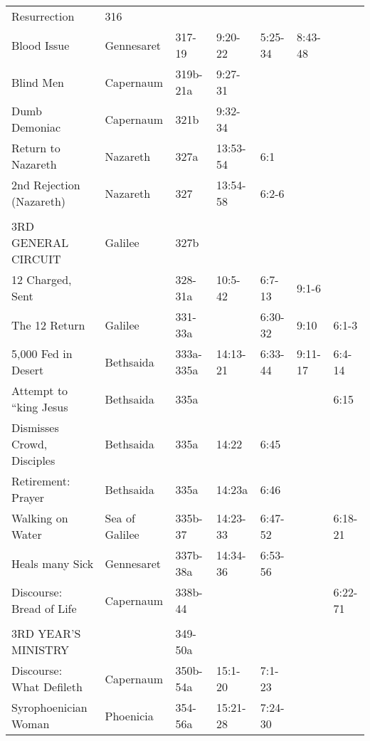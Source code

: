 \begin{longtable}[h]{lllllll}
\qquad Resurrection                & 316                 &            &                 &                 &                      & \\
\quad Blood Issue                  & Gennesaret          & 317-19     & 9:20-22         & 5:25-34         & 8:43-48              & \\
\quad 2 Blind Men                  & Capernaum           & 319b-21a   & 9:27-31         &                 &                      & \\
\quad Dumb Demoniac                & Capernaum           & 321b       & 9:32-34         &                 &                      & \\
Return to Nazareth                 & Nazareth            & 327a       & 13:53-54        & 6:1             &                      & \\
2nd Rejection (Nazareth)           & Nazareth            & 327        & 13:54-58        & 6:2-6           &                      & \\
\\
3RD GENERAL CIRCUIT                & Galilee             & 327b       &                 &                 &                      & \\
12 Charged, Sent                   &                     & 328-31a    & 10:5-42         & 6:7-13          & 9:1-6                & \\
The 12 Return & Galilee & 331-33a &  & 6:30-32 & 9:10 & 6:1-3 \\
5,000 Fed in Desert & Bethsaida & 333a-335a & 14:13-21 & 6:33-44 & 9:11-17 &  6:4-14 \\
\quad Attempt to ``king Jesus & Bethsaida & 335a &  &  &  & 6:15 \\
\quad Dismisses Crowd, Disciples & Bethsaida & 335a & 14:22 & 6:45 & & \\
\quad Retirement: Prayer & Bethsaida & 335a & 14:23a & 6:46 &  &  \\
Walking on Water & Sea of Galilee & 335b-37 & 14:23-33 & 6:47-52 &  & 6:18-21 \\
Heals many Sick & Gennesaret & 337b-38a & 14:34-36 & 6:53-56 &  &  \\
Discourse: Bread of Life & Capernaum & 338b-44 &  &  &  & 6:22-71 \\
\\
3RD YEAR'S MINISTRY &  & 349-50a &  &  &  &  \\
Discourse: What Defileth & Capernaum & 350b-54a & 15:1-20 & 7:1-23 &  &  \\
Syrophoenician Woman & Phoenicia & 354-56a & 15:21-28 & 7:24-30 &  &  \\
\end{longtable}
